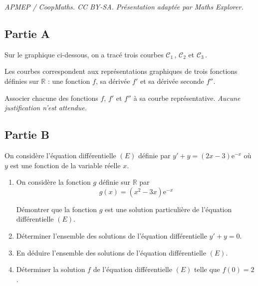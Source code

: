 \documentclass[10pt]{article}
\providecommand{\R}{\mathbb{R}}
\providecommand{\e}{{\mathrm{e}}}
\begin{document}
\noindent\textit{APMEP / CoopMaths. CC BY-SA. Présentation adaptée par Maths Explorer.}\par\medskip
\subsection*{Partie A}
Sur le graphique ci-dessous, on a tracé trois courbes $\mathcal{C}_{1}$\,, $\mathcal{C}_{2}$ et $\mathcal{C}_{3}$\,.

Les courbes correspondent aux représentations graphiques de trois fonctions définies sur $\R$ : une fonction $f$, sa dérivée $f'$ et sa dérivée seconde $f''$.

\begin{center}
\end{center}

Associer chacune des fonctions $f$, $f'$ et $f''$ à sa courbe représentative. \emph{Aucune justification n'est attendue.}


\subsection*{Partie B}
On considère l'équation différentielle $(E)$ définie par $y'+y=(2 x-3) \e^{-x}$ où $y$ est une fonction de la variable réelle $x$.

\begin{enumerate}
	\item On considère la fonction $g$ définie sur $\R$ par
	\[g(x)=\left(x^{2}-3 x\right) \e^{-x}\]

	Démontrer que la fonction $g$ est une solution particulière de l'équation différentielle $(E)$.

	\item Déterminer l'ensemble des solutions de l'équation différentielle \quad $y'+y=0$.

	\item En déduire l'ensemble des solutions de l'équation différentielle $(E)$.

	\item Déterminer la solution $f$ de l'équation différentielle $(E)$ telle que \quad $f(0)=2$.
\end{enumerate}
\end{document}
